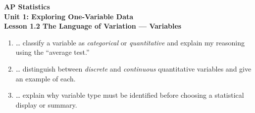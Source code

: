 \documentclass[10pt]{article}
\begin{document}
\vspace{-0.8in}

\begin{center}
  {\color{white}\textbf{\LARGE AP Statistics}}\\[4pt]
  {\color{skymid}\large\textbf{Unit 1: Exploring One-Variable Data}}\\[6pt]
  {\color{white}\textbf{\large Lesson 1.2 \quad The Language of Variation --- Variables}}
\end{center}

\vspace{0.22in}

\namedateperiod

\vspace{0.18in}

\begin{learningtargetbox}
\small
\begin{enumerate}[leftmargin=1.5em, itemsep=5pt]
  \item \ldots{} classify a variable as \textit{categorical} or \textit{quantitative}
        and explain my reasoning using the ``average test.''
  \item \ldots{} distinguish between \textit{discrete} and \textit{continuous}
        quantitative variables and give an example of each.
  \item \ldots{} explain why variable type must be identified before choosing a
        statistical display or summary.
\end{enumerate}
\end{learningtargetbox}

\vspace{0.14in}
\end{document}
